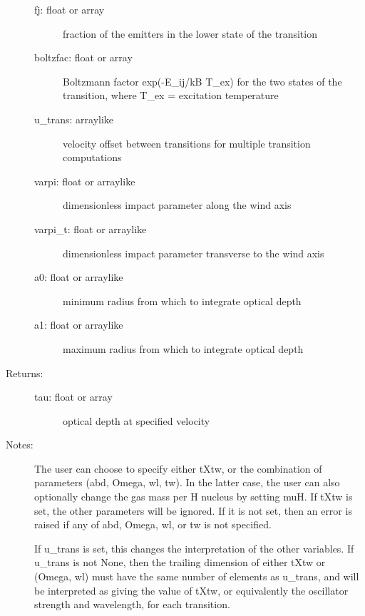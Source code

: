 \documentclass[letterpaper,10pt,english]{sphinxmanual}
\begin{document}
\begin{fulllineitems}
\begin{fulllineitems}
\begin{description}
\begin{description}
\item[{fj: float or array}] \leavevmode
fraction of the emitters in the lower state of the
transition

\item[{boltzfac: float or array}] \leavevmode
Boltzmann factor exp(-E\_ij/kB T\_ex) for the two states of
the transition, where T\_ex = excitation temperature

\item[{u\_trans: arraylike}] \leavevmode
velocity offset between transitions for multiple
transition computations

\item[{varpi: float or arraylike}] \leavevmode
dimensionless impact parameter along the wind axis

\item[{varpi\_t: float or arraylike}] \leavevmode
dimensionless impact parameter transverse to the wind axis

\item[{a0: float or arraylike}] \leavevmode
minimum radius from which to integrate optical depth

\item[{a1: float or arraylike}] \leavevmode
maximum radius from which to integrate optical depth

\end{description}

\item[{Returns:}] \leavevmode\begin{description}
\item[{tau: float or array}] \leavevmode
optical depth at specified velocity

\end{description}

\item[{Notes:}] \leavevmode
The user can choose to specify either tXtw, or the
combination of parameters (abd, Omega, wl, tw). In the
latter case, the user can also optionally change the gas
mass per H nucleus by setting muH. If tXtw is set, the
other parameters will be ignored. If it is not set, then an
error is raised if any of abd, Omega, wl, or tw is not
specified.

If u\_trans is set, this changes the interpretation of the
other variables. If u\_trans is not None, then the trailing
dimension of either tXtw or (Omega, wl) must have the same
number of elements as u\_trans, and will be interpreted as
giving the value of tXtw, or equivalently the oscillator
strength and wavelength, for each transition.


\end{description}
\end{fulllineitems}
\end{fulllineitems}
\end{document}
